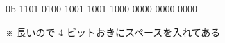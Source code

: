 \begin{center}
0b 1101 0100 1001 1001 1000 0000 0000 0000

\noindent ※ 長いので 4 ビットおきにスペースを入れてある
\end{center}
